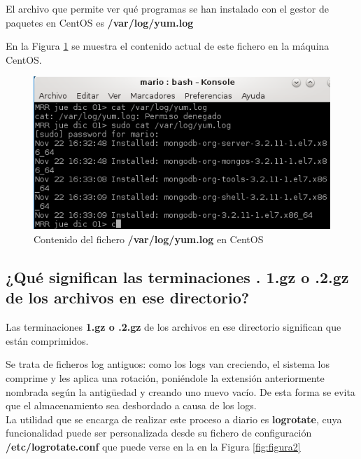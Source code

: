 El archivo que permite ver qué programas se han instalado con el gestor de paquetes en CentOS es \textbf{/var/log/yum.log} \cite{enlace1}

En la Figura \ref{fig:figura1} se muestra el contenido actual de este fichero en la máquina CentOS.
\begin{figure}[H] %
	\centering
	\includegraphics[scale=0.9]{figuras/figura1.png} 
	\caption{Contenido del fichero \textbf{/var/log/yum.log} en CentOS} 
	\label{fig:figura1}
\end{figure}

\subsection{¿Qué significan las terminaciones .
	1.gz o .2.gz de los archivos en ese directorio?}
	
Las terminaciones \textbf{1.gz o .2.gz} de los archivos en ese directorio significan que están comprimidos. 

Se trata de ficheros log antiguos: como los logs van creciendo, el sistema los comprime y les aplica una rotación, 
poniéndole la extensión anteriormente nombrada según la antigüedad y creando uno nuevo vacío. \cite{enlace2}
De esta forma se evita que el almacenamiento sea desbordado a causa de los logs.
\\

La utilidad que se encarga de realizar este proceso a diario es \textbf{logrotate}, cuya funcionalidad puede ser personalizada desde su fichero de configuración \textbf{/etc/logrotate.conf} que puede verse en la en la Figura \ref{fig:figura2}

